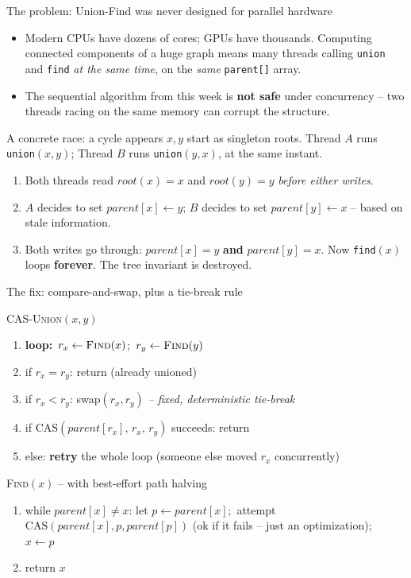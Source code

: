 \documentclass[11pt,aspectratio=169]{beamer}
\begin{document}
\begin{frame}{The problem: Union-Find was never designed for parallel hardware}
  \begin{itemize}
    \item Modern CPUs have dozens of cores; GPUs have thousands. Computing connected
    components of a huge graph means many threads calling \texttt{union} and
    \texttt{find} \emph{at the same time}, on the \emph{same} \texttt{parent[]} array.
    \item The sequential algorithm from this week is \textbf{not safe} under
    concurrency -- two threads racing on the same memory can corrupt the structure.
  \end{itemize}
  \begin{exampleblock}{A concrete race: a cycle appears}
    $x,y$ start as singleton roots. Thread $A$ runs \texttt{union}$(x,y)$; Thread $B$
    runs \texttt{union}$(y,x)$, at the same instant.
    \begin{enumerate}
      \item Both threads read $root(x)=x$ and $root(y)=y$ \emph{before either writes}.
      \item $A$ decides to set $parent[x] \gets y$; $B$ decides to set $parent[y]
      \gets x$ -- based on stale information.
      \item Both writes go through: $parent[x]=y$ \textbf{and} $parent[y]=x$. Now
      \texttt{find}$(x)$ loops \textbf{forever}. The tree invariant is destroyed.
    \end{enumerate}
  \end{exampleblock}
\end{frame}

\begin{frame}{The fix: compare-and-swap, plus a tie-break rule}
  \begin{block}{\textsc{CAS-Union}$(x,y)$}
  \begin{enumerate}
    \item \textbf{loop:}\ $r_x \gets \textsc{Find}(x)$;\ $r_y \gets \textsc{Find}(y)$
    \item if $r_x = r_y$: return (already unioned)
    \item if $r_x < r_y$: swap$(r_x, r_y)$ \hfill \small\emph{-- fixed, deterministic tie-break}
    \item if $\text{CAS}(parent[r_x],\, r_x,\, r_y)$ succeeds: return
    \item else: \textbf{retry} the whole loop (someone else moved $r_x$ concurrently)
  \end{enumerate}
  \end{block}
  \begin{block}{\textsc{Find}$(x)$ -- with best-effort path halving}
  \begin{enumerate}
    \item while $parent[x] \ne x$: let $p \gets parent[x]$;\ attempt
    $\text{CAS}(parent[x], p, parent[p])$ (ok if it fails -- just an optimization);\
    $x \gets p$
    \item return $x$
  \end{enumerate}
  \end{block}
\end{frame}
\end{document}

